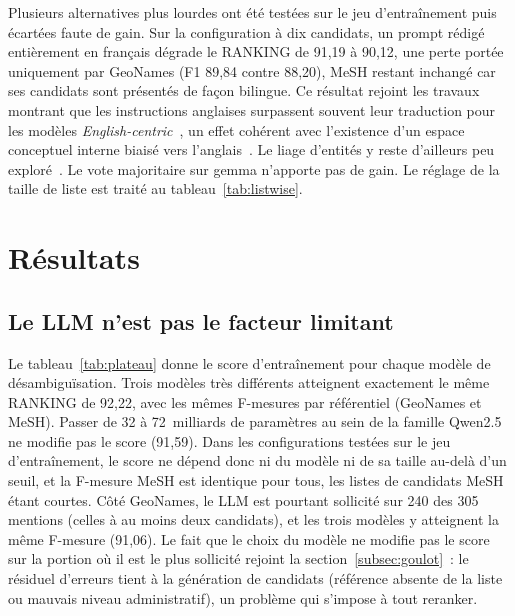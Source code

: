\documentclass[10pt,twoside]{article}
\begin{document}
Plusieurs alternatives plus lourdes ont été testées sur le jeu d'entraînement puis écartées faute de
gain. Sur la configuration à dix candidats, un prompt rédigé entièrement en français dégrade le RANKING
de 91,19 à 90,12, une perte portée uniquement par GeoNames (F1 89,84 contre 88,20), MeSH restant
inchangé car ses candidats sont présentés de façon bilingue. Ce résultat rejoint les travaux
montrant que les instructions anglaises surpassent souvent leur traduction pour les modèles
\emph{English-centric}~\cite{lai2023beyond}, un effet cohérent avec l'existence d'un espace conceptuel interne
biaisé vers l'anglais~\cite{wendler2024llamas}. Le liage d'entités y reste d'ailleurs peu
exploré~\cite{zaghir2024prompt}. Le vote majoritaire sur gemma n'apporte
pas de gain. Le réglage de la taille de liste est traité au
tableau~\ref{tab:listwise}.

\section{Résultats}
\label{sec:resultats}

\subsection{Le LLM n'est pas le facteur limitant}
Le tableau~\ref{tab:plateau} donne le score d'entraînement pour chaque modèle de désambiguïsation.
Trois modèles très différents atteignent exactement le même RANKING de 92,22, avec les
mêmes F-mesures par référentiel (GeoNames et MeSH). Passer de 32 à 72~milliards de paramètres au sein
de la famille Qwen2.5 ne modifie pas le score (91,59). Dans les configurations testées sur le jeu d'entraînement, le score ne dépend
donc ni du modèle ni de sa taille au-delà d'un seuil, et la F-mesure MeSH est identique pour tous, les listes de candidats MeSH
étant courtes. Côté GeoNames, le LLM est pourtant sollicité sur 240 des 305 mentions (celles à au
moins deux candidats), et les trois modèles y atteignent la même F-mesure (91,06). Le fait que le choix du
modèle ne modifie pas le score sur la portion où il est le plus sollicité rejoint la section~\ref{subsec:goulot}~: le
résiduel d'erreurs tient à la génération de candidats (référence absente de la liste ou mauvais
niveau administratif), un problème qui s'impose à tout reranker.
\end{document}
